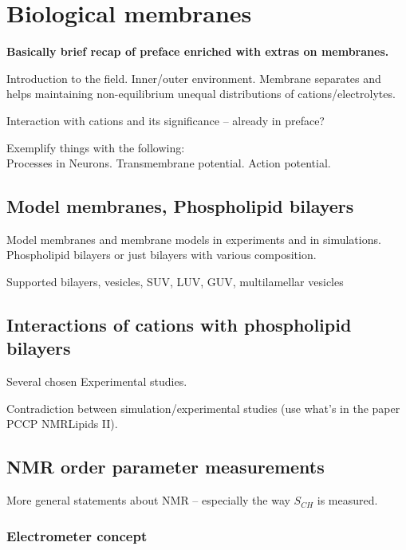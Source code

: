 \chapter{Biological membranes}
\label{chap:intro}

 \textbf{Basically brief recap of preface enriched with extras on membranes.}

 Introduction to the field. 
 Inner/outer environment. 
 Membrane separates and helps maintaining non-equilibrium unequal distributions of cations/electrolytes. 

 Interaction with cations and its significance -- already in preface?

 Exemplify things with the following: \\
 Processes in Neurons. 
 Transmembrane potential. 
 Action potential. 



\section{Model membranes, Phospholipid bilayers }

 Model membranes and membrane models in experiments and in simulations.
 Phospholipid bilayers or just bilayers with various composition. 

 Supported bilayers, vesicles, SUV, LUV, GUV, multilamellar vesicles



\section{Interactions of cations with phospholipid bilayers}

 Several chosen Experimental studies. 

 Contradiction between simulation/experimental studies 
 (use what's in the paper PCCP NMRLipids II). 




\section{NMR order parameter measurements}
 
  More general statements about NMR  -- especially the way $S_{CH}$ is measured. 

\subsection{Electrometer concept} \label{section:electrometer} 

